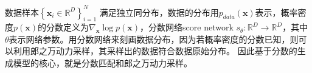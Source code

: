\documentclass[lang=cn,newtx,10pt,scheme=chinese]{elegantbook}
\begin{document}

数据样本$\left\{\mathbf{x}_i \in \mathbb{R}^D\right\}_{i=1}^N$ 满足独立同分布，数据的分布用$p_{data}(\mathbf{x})$表示，概率密度$p(\mathbf{x})$的分数定义为$\nabla_{\mathbf{x}} \log p(\mathbf{x})$，分数网络score network $s_{\theta}:\mathbb{R}^D \rightarrow \mathbb{R}^D$，其中$\theta$表示网络参数。用分数网络来刻画数据分布，因为若概率密度的分数已知，则可以利用郎之万动力采样，其采样出的数据符合数据原始分布。 因此基于分数的生成模型的核心，就是分数匹配和郎之万动力采样。
\end{document}
